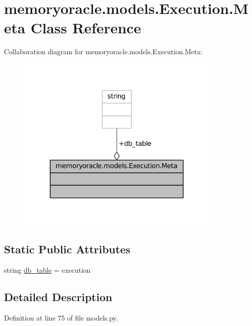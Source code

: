 \hypertarget{classmemoryoracle_1_1models_1_1Execution_1_1Meta}{}\section{memoryoracle.\+models.\+Execution.\+Meta Class Reference}
\label{classmemoryoracle_1_1models_1_1Execution_1_1Meta}


Collaboration diagram for memoryoracle.\+models.\+Execution.\+Meta\+:\nopagebreak
\begin{figure}[H]
\begin{center}
\leavevmode
\includegraphics[width=281pt]{classmemoryoracle_1_1models_1_1Execution_1_1Meta__coll__graph}
\end{center}
\end{figure}
\subsection*{Static Public Attributes}
\begin{DoxyCompactItemize}
\item 
string \hyperlink{classmemoryoracle_1_1models_1_1Execution_1_1Meta_a126a8741d36c9f383107c8fde73c642c}{db\+\_\+table} = \textquotesingle{}execution\textquotesingle{}
\end{DoxyCompactItemize}


\subsection{Detailed Description}


Definition at line 75 of file models.\+py.



